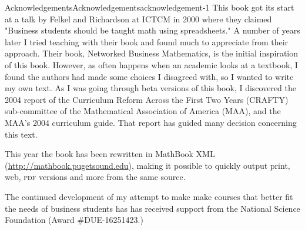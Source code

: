 \documentclass[oneside,10pt,]{book}
\newcommand{\acronym}[1]{\textsc{\MakeLowercase{#1}}}
\numberwithin{equation}{section}
\begin{document}
\begin{acknowledgement}{Acknowledgements}{}{Acknowledgements}{}{}{acknowledgement-1}
\hypertarget{p-1}{}%
This book got its start at a talk by Felkel and Richardson  at ICTCM in 2000 where they claimed "Business students should be taught math using spreadsheets."  A number of years later I tried teaching with their book and found much to appreciate from their approach.  Their book, Networked Business Mathematics, is the initial inspiration of this book.  However, as often happens when an academic looks at a textbook, I found the authors had made some choices I disagreed with, so I wanted to write my own text.  As I was going through beta versions of this book, I  discovered the 2004 report of the Curriculum Reform Across the First Two Years (CRAFTY) sub-committee of the Mathematical Association of America (MAA), and the MAA's 2004 curriculum guide.  That report has guided many decision concerning this text.%
\par
\hypertarget{p-2}{}%
This year the book has been rewritten in MathBook XML (\href{http://mathbook.pugetsound.edu}{http:\slash{}\slash{}mathbook.pugetsound.edu}), making it possible to quickly output print, web, \acronym{PDF} versions and more from the same source.%
\par
\hypertarget{p-3}{}%
The continued development of my attempt to make make courses that better fit the needs of business students has  has received support from the National Science Foundation (Award \#DUE-16251423.)%
\end{acknowledgement}
%
%
\typeout{************************************************}
\typeout{************************************************}
%
\end{document}
